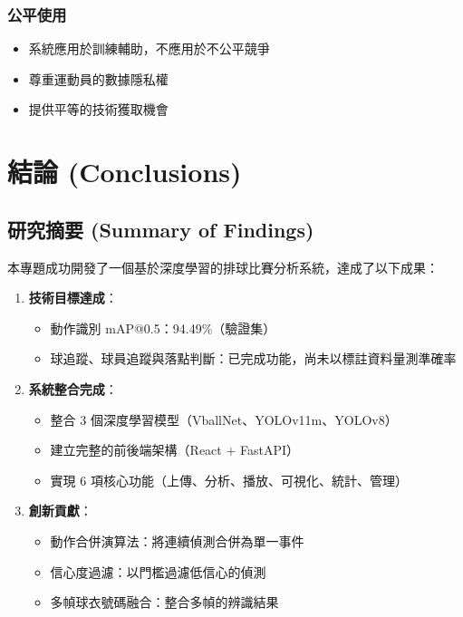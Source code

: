 \documentclass[a4paper,14pt,oneside]{article}
\begin{document}
\subsubsection{公平使用}
\begin{itemize}
    \item 系統應用於訓練輔助，不應用於不公平競爭
    \item 尊重運動員的數據隱私權
    \item 提供平等的技術獲取機會
\end{itemize}

\newpage
\section{結論 (Conclusions)}

\subsection{研究摘要 (Summary of Findings)}

本專題成功開發了一個基於深度學習的排球比賽分析系統，達成了以下成果：

\begin{enumerate}
    \item \textbf{技術目標達成}：
    \begin{itemize}
        \item 動作識別 mAP@0.5：94.49\%（驗證集）
        \item 球追蹤、球員追蹤與落點判斷：已完成功能，尚未以標註資料量測準確率
    \end{itemize}
    
    \item \textbf{系統整合完成}：
    \begin{itemize}
        \item 整合 3 個深度學習模型（VballNet、YOLOv11m、YOLOv8）
        \item 建立完整的前後端架構（React + FastAPI）
        \item 實現 6 項核心功能（上傳、分析、播放、可視化、統計、管理）
    \end{itemize}
    
    \item \textbf{創新貢獻}：
    \begin{itemize}
        \item 動作合併演算法：將連續偵測合併為單一事件
        \item 信心度過濾：以門檻過濾低信心的偵測
        \item 多幀球衣號碼融合：整合多幀的辨識結果
    \end{itemize}
\end{enumerate}
\end{document}
